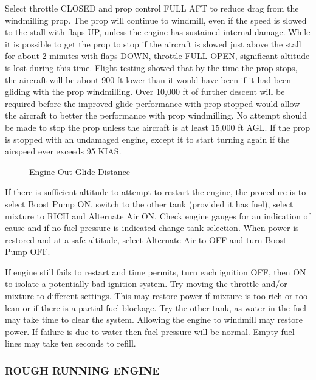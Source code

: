 Select throttle CLOSED and prop control FULL AFT to reduce drag from the windmilling prop.  The prop will continue to windmill, even if the speed is slowed to the stall with flaps UP, unless the engine has sustained internal damage.  While it is possible to get the prop to stop if the aircraft is slowed just above the stall for about 2 minutes with flaps DOWN, throttle FULL OPEN, significant altitude is lost during this time.  Flight testing showed that by the time the prop stops, the aircraft will be about 900 ft lower than it would have been if it had been gliding with the prop windmilling.  Over 10,000 ft of further descent will be required before the improved glide performance with prop stopped would allow the aircraft to better the performance with prop windmilling.  No attempt should be made to stop the prop unless the aircraft is at least 15,000 ft AGL.  If the prop is stopped with an undamaged engine, except it to start turning again if the airspeed ever exceeds 95 KIAS.

\begin{figure}[htb]
  \begin{center}
  \end{center}  %
  \caption{Engine-Out Glide Distance}
  \end{figure}



If there is sufficient altitude to attempt to restart the engine, 
the procedure is to select Boost Pump ON, switch to the other
tank (provided it has fuel), select mixture to RICH and Alternate
Air ON. Check engine gauges for an indication of cause and if no fuel
pressure is indicated change tank selection. When power is restored
and at a safe altitude, select Alternate Air to OFF and turn Boost
Pump OFF.

If engine still fails to restart and time permits, turn each ignition
OFF, then ON to isolate a potentially bad ignition system. Try moving
the throttle and/or mixture to different settings. This may restore
power if mixture is too rich or too lean or if there is a partial
fuel blockage. Try the other tank, as water in the fuel may take time
to clear the system. Allowing the engine to windmill may restore power.
If failure is due to water then fuel pressure will be normal. Empty
fuel lines may take ten seconds to refill.

\subsubsection{ROUGH RUNNING ENGINE}

